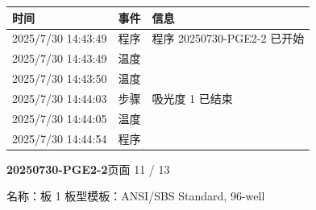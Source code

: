 \documentclass[UTF8,10pt,a4paper,fontset=fandol]{ctexart}
\newcommand{\fieldvalue}[1]{#1}
\begin{document}
\begin{center}
\begin{center}
\small
\begin{tabularx}{\textwidth}{@{}l l X@{}}
时间 & 事件 & 信息 \\ \hline
\fieldvalue{2025/7/30 14:43:49}
&
\fieldvalue{程序}
&
\fieldvalue{程序 20250730-PGE2-2 已开始}
\\
\fieldvalue{2025/7/30 14:43:49}
&
\fieldvalue{温度}
&
\\
\fieldvalue{2025/7/30 14:43:50}
&
\fieldvalue{温度}
&
\\
\fieldvalue{2025/7/30 14:44:03}
&
\fieldvalue{步骤}
&
\fieldvalue{吸光度 1 已结束}
\\
\fieldvalue{2025/7/30 14:44:05}
&
\fieldvalue{温度}
&
\\
\fieldvalue{2025/7/30 14:44:54}
&
\fieldvalue{程序}
&
\end{tabularx}
\normalsize

\newpage

\noindent\textbf{20250730-PGE2-2}\hfill 页面 11 / 13

\noindent 名称：板 1 \hfill 板型模板：ANSI/SBS Standard, 96-well

\medskip


\end{center}
\end{center}
\end{document}
